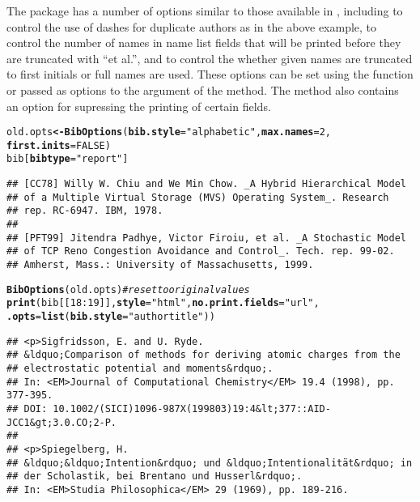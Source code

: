 \documentclass[article]{jss}\usepackage[]{graphicx}\usepackage[]{color}
\makeatletter
\newcommand{\hlnum}[1]{\textcolor[rgb]{0.125,0.125,1}{#1}}%
\newcommand{\hlstr}[1]{\textcolor[rgb]{0.125,0.125,1}{#1}}%
\newcommand{\hlcom}[1]{\textcolor[rgb]{1,0,0.753}{\textit{#1}}}%
\newcommand{\hlopt}[1]{\textcolor[rgb]{0.251,0.251,0.282}{#1}}%
\newcommand{\hlstd}[1]{\textcolor[rgb]{0.251,0.251,0.282}{#1}}%
\newcommand{\hlkwb}[1]{\textcolor[rgb]{0.439,0.251,1}{\textbf{#1}}}%
\newcommand{\hlkwc}[1]{\textcolor[rgb]{0.529,0,0.184}{\textbf{#1}}}%
\newcommand{\hlkwd}[1]{\textcolor[rgb]{0.251,0.251,0.282}{\textbf{#1}}}%
\newenvironment{kframe}{%
 \def\at@end@of@kframe{}%
 \ifinner\ifhmode%
  \def\at@end@of@kframe{\end{minipage}}%
  \begin{minipage}{\columnwidth}%
 \fi\fi%
 \def\FrameCommand##1{\hskip\@totalleftmargin \hskip-\fboxsep
 \colorbox{shadecolor}{##1}\hskip-\fboxsep
     \hskip-\linewidth \hskip-\@totalleftmargin \hskip\columnwidth}%
 \MakeFramed {\advance\hsize-\width
   \@totalleftmargin\z@ \linewidth\hsize
   \@setminipage}}%
 {\par\unskip\endMakeFramed%
 \at@end@of@kframe}
\newenvironment{knitrout}{}{} %
\makeatother
\begin{document}
The package has a number of options similar to those available in \Biblatex{}, including  to control the use of dashes for duplicate authors as in the above example,  to control the number of names in name list fields that will be printed before they are truncated with ``et al.'', and  to control the whether given names are truncated to first initials or full names are used.  These options can be set using the  function or passed as options to the  argument of the  method. The  method also contains an option for supressing the printing of certain fields.
\begin{knitrout}
\color{fgcolor}\begin{kframe}
\begin{alltt}
\hlstd{old.opts} \hlkwb{<-} \hlkwd{BibOptions}\hlstd{(}\hlkwc{bib.style} \hlstd{=} \hlstr{"alphabetic"}\hlstd{,} \hlkwc{max.names} \hlstd{=} \hlnum{2}\hlstd{,}
                       \hlkwc{first.inits} \hlstd{=} \hlnum{FALSE}\hlstd{)}
\hlstd{bib[}\hlkwc{bibtype} \hlstd{=} \hlstr{"report"}\hlstd{]}
\end{alltt}
\begin{verbatim}
## [CC78] Willy W. Chiu and We Min Chow. _A Hybrid Hierarchical Model
## of a Multiple Virtual Storage (MVS) Operating System_. Research
## rep. RC-6947. IBM, 1978.
## 
## [PFT99] Jitendra Padhye, Victor Firoiu, et al. _A Stochastic Model
## of TCP Reno Congestion Avoidance and Control_. Tech. rep. 99-02.
## Amherst, Mass.: University of Massachusetts, 1999.
\end{verbatim}
\begin{alltt}
\hlkwd{BibOptions}\hlstd{(old.opts)}  \hlcom{# reset to original values}
\hlkwd{print}\hlstd{(bib[[}\hlnum{18}\hlopt{:}\hlnum{19}\hlstd{]],} \hlkwc{style} \hlstd{=} \hlstr{"html"}\hlstd{,} \hlkwc{no.print.fields} \hlstd{=} \hlstr{"url"}\hlstd{,}
      \hlkwc{.opts} \hlstd{=} \hlkwd{list}\hlstd{(}\hlkwc{bib.style} \hlstd{=} \hlstr{"authortitle"}\hlstd{))}
\end{alltt}
\begin{verbatim}
## <p>Sigfridsson, E. and U. Ryde.
## &ldquo;Comparison of methods for deriving atomic charges from the
## electrostatic potential and moments&rdquo;.
## In: <EM>Journal of Computational Chemistry</EM> 19.4 (1998), pp. 377-395.
## DOI: 10.1002/(SICI)1096-987X(199803)19:4&lt;377::AID-JCC1&gt;3.0.CO;2-P.
## 
## <p>Spiegelberg, H.
## &ldquo;&ldquo;Intention&rdquo; und &ldquo;Intentionalität&rdquo; in
## der Scholastik, bei Brentano und Husserl&rdquo;.
## In: <EM>Studia Philosophica</EM> 29 (1969), pp. 189-216.
\end{verbatim}
\end{kframe}
\end{knitrout}
\end{document}
